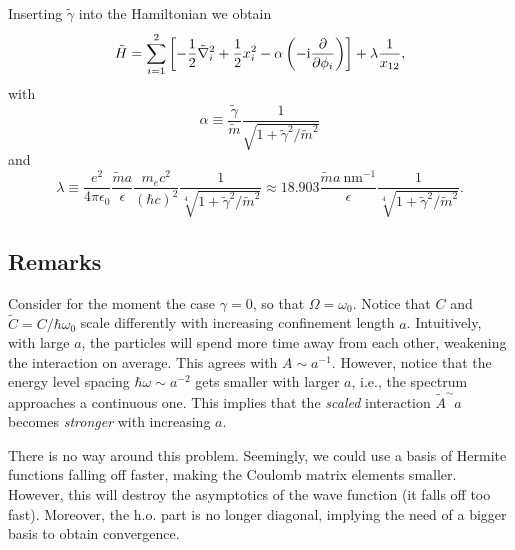 \documentclass{article}
\begin{document}
Inserting $\tilde{\gamma}$ into the Hamiltonian we obtain
\[ \tilde{H} = \sum_{i=1}^2 \left[-\frac{1}{2}\tilde{\nabla}_i^2 +
  \frac{1}{2} x_i^2 - \alpha\left(-\mathrm{i}\frac{\partial}{\partial \phi_i}\right) \right] + \lambda\frac{1}{x_{12}}, \]
with
\[ \alpha \equiv \frac{\tilde{\gamma}}{\tilde{m}} \frac{1}{\sqrt{1 +
    \tilde{\gamma}^2/\tilde{m}^2}} \]
and
\[ \lambda \equiv \frac{e^2}{4\pi\epsilon_0}\frac{\tilde{m}a}{\epsilon}
\frac{m_ec^2}{(\hbar c)^2}
\frac{1}{\sqrt[4]{1+\tilde{\gamma}^2/\tilde{m}^2}} \approx 18.903
\frac{\tilde{m}a\:\mathrm{nm}^{-1}}{\epsilon} \frac{1}{\sqrt[4]{1+\tilde{\gamma}^2/\tilde{m}^2}}.\]


\subsection*{Remarks}

Consider for the moment the case $\gamma=0$, so that $\Omega=\omega_0$.
Notice that $C$ and $\tilde{C}=C/\hbar\omega_0$ scale differently with increasing
confinement length $a$. Intuitively, with large $a$, the particles will
spend more time away from each other, weakening the interaction on
average. This agrees with $A \sim a^{-1}$. However, notice that the
energy level spacing $\hbar\omega \sim a^{-2}$ gets smaller with
larger $a$, i.e., the spectrum approaches a continuous one. This
implies that the \emph{scaled} interaction 
$\tilde{A}^ \sim a$ becomes \emph{stronger} with increasing $a$.

There is no way around this problem. Seemingly, we could use a basis
of Hermite functions falling off faster, making the Coulomb matrix
elements smaller. However, this will destroy the asymptotics of the
wave function (it falls off too fast). Moreover, the h.o. part is no
longer diagonal, implying the need of a bigger basis to obtain
convergence. 
\end{document}
